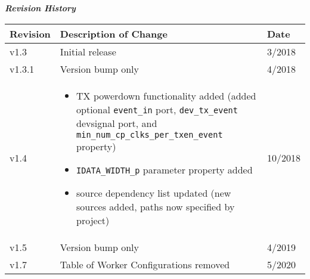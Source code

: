 \begin{center}
	\textit{\textbf{Revision History}}
	\begin{table}[H]
		\label{table:revisions} %
		\begin{longtable}{|p{}
                          |p{}
                          |p{}|}
			\hline
			\rowcolor{blue}
			\textbf{Revision} & \textbf{Description of Change} & \textbf{Date} \\
			\hline
			v1.3 & Initial release & 3/2018 \\
			\hline
			v1.3.1 & Version bump only & 4/2018 \\
			\hline
			v1.4 &
			\begin{itemize}
				\item TX powerdown functionality added (added optional \verb+event_in+ port, \verb+dev_tx_event+ devsignal port, and \verb+min_num_cp_clks_per_txen_event+ property)
				\item \verb+IDATA_WIDTH_p+ parameter property added
				\item source dependency list updated (new sources added, paths now specified by project)
			\end{itemize} & 10/2018 \\
			\hline
			v1.5 & Version bump only & 4/2019 \\
			\hline
			v1.7 & Table of Worker Configurations removed & 5/2020 \\
			\hline
		\end{longtable}
	\end{table}
\end{center}
\newpage

\def\name{\comp}
\def\workertype{Device}
\def\version{\ocpiversion}
\def\releasedate{4/2019}
\def\componentlibrary{ocpi.assets.devices}
\def\workers{\comp{}.hdl}
\def\testedplatforms{{
  \begin{itemize}
    \item Agilent Zedboard/Analog Devices FMCOMMS2 (Vivado only)
    \item Agilent Zedboard/Analog Devices FMCOMMS3 (Vivado only)
    \item x86/Xilinx ML605/Analog Devices FMCOMMS2 (FMC-LPC slot only)
    \item x86/Xilinx ML605/Analog Devices FMCOMMS3 (FMC-LPC slot only)
    \item Ettus E310 (Vivado only, application for testing exists in e310 project)
  \end{itemize}
}}


